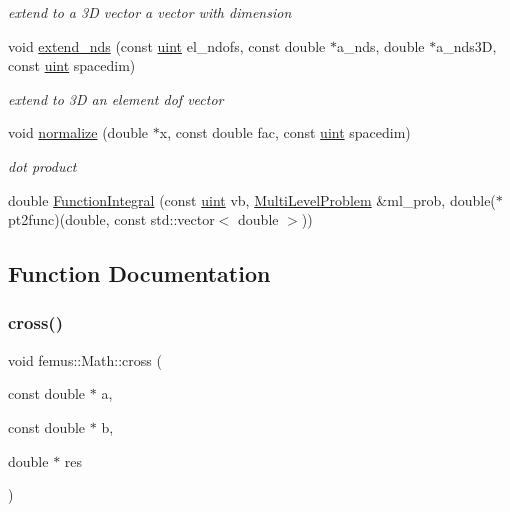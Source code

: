 \begin{DoxyCompactItemize}
\begin{DoxyCompactList}\small\item\em extend to a 3D vector a vector with dimension \end{DoxyCompactList}\item 
void \mbox{\hyperlink{namespacefemus_1_1_math_a2328868c7aa18860c4a4f14cd9573c8e}{extend\+\_\+nds}} (const \mbox{\hyperlink{_typedefs_8hpp_a91ad9478d81a7aaf2593e8d9c3d06a14}{uint}} el\+\_\+ndofs, const double $\ast$a\+\_\+nds, double $\ast$a\+\_\+nds3D, const \mbox{\hyperlink{_typedefs_8hpp_a91ad9478d81a7aaf2593e8d9c3d06a14}{uint}} spacedim)
\begin{DoxyCompactList}\small\item\em extend to 3D an element dof vector \end{DoxyCompactList}\item 
void \mbox{\hyperlink{namespacefemus_1_1_math_a3c615988fe381fae399525c16a2941c5}{normalize}} (double $\ast$x, const double fac, const \mbox{\hyperlink{_typedefs_8hpp_a91ad9478d81a7aaf2593e8d9c3d06a14}{uint}} spacedim)
\begin{DoxyCompactList}\small\item\em dot product \end{DoxyCompactList}\item 
double \mbox{\hyperlink{namespacefemus_1_1_math_a02f12dcb565caafc80da2ebb652541fb}{Function\+Integral}} (const \mbox{\hyperlink{_typedefs_8hpp_a91ad9478d81a7aaf2593e8d9c3d06a14}{uint}} vb, \mbox{\hyperlink{classfemus_1_1_multi_level_problem}{Multi\+Level\+Problem}} \&ml\+\_\+prob, double($\ast$pt2func)(double, const std\+::vector$<$ double $>$))
\end{DoxyCompactItemize}


\subsection{Function Documentation}
\mbox{\label{namespacefemus_1_1_math_a06daa97a94cd109a7d0229d4e23a40d6}} 
\subsubsection{\texorpdfstring{cross()}{cross()}}
{\footnotesize\ttfamily void femus\+::\+Math\+::cross (\begin{DoxyParamCaption}\item[{const double $\ast$}]{a,  }\item[{const double $\ast$}]{b,  }\item[{double $\ast$}]{res }\end{DoxyParamCaption})\hspace{0.3cm}{\ttfamily [inline]}}



